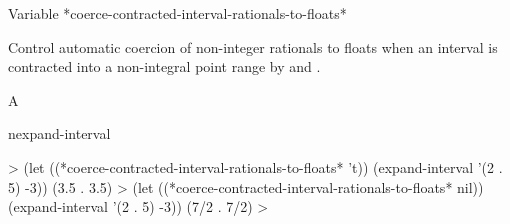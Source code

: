 \documentclass[10pt,twoside,english,pdftex]{article}
\begin{document}
\begin{functiondoc}%
  {Variable}%
  {*coerce-contracted-interval-rationals-to-floats*}{}%

\fnsyntax

\fnpurpose Control automatic coercion of non-integer rationals to floats when
an interval is contracted into a non-integral point range by
\textbf{} and \textbf{}.

\fnpackage {}

\fnmodule {}

\fnvaluetype A 

\fninitialvalue \nil{}

\begin{alsos}{nexpand-interval}
\end{alsos}

\fnexamples
%
%
%
\W\supp
\begin{example}
  > (let ((*coerce-contracted-interval-rationals-to-floats* 't))
       (expand-interval '(2 . 5) -3))
  (3.5 . 3.5)
  > (let ((*coerce-contracted-interval-rationals-to-floats* nil))
       (expand-interval '(2 . 5) -3))
  (7/2 . 7/2)
  >
\end{example}

\end{functiondoc}

\end{document}
